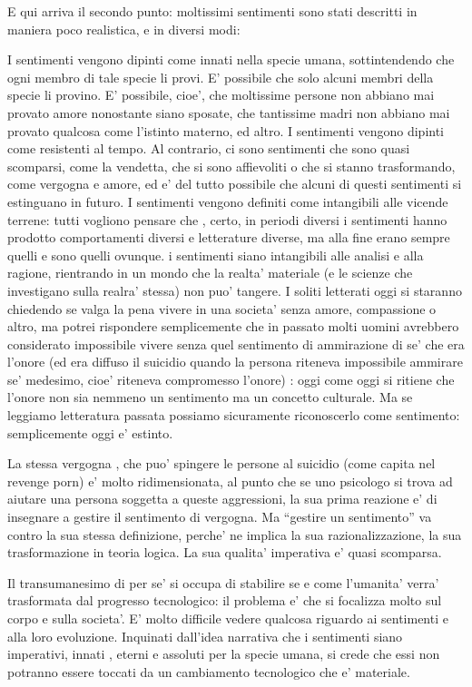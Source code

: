 \documentclass[dvipsnames]{amsart}
\begin{document}
  E qui arriva il secondo punto: moltissimi sentimenti sono stati descritti in maniera poco realistica, e in diversi modi:
  
  I sentimenti vengono dipinti come innati nella specie umana, sottintendendo che ogni membro di tale specie li provi. E’ possibile che solo alcuni membri della specie li provino. E’ possibile, cioe’, che moltissime persone non abbiano mai provato amore nonostante siano sposate, che tantissime madri non abbiano mai provato qualcosa come l’istinto materno, ed altro.
  I sentimenti vengono dipinti come resistenti al tempo. Al contrario, ci sono sentimenti che sono quasi scomparsi, come la vendetta, che si sono affievoliti o che si stanno trasformando, come vergogna e amore, ed e’ del tutto possibile che alcuni di questi sentimenti si estinguano in futuro.
  I sentimenti vengono definiti come intangibili alle vicende terrene: tutti vogliono pensare che , certo, in periodi diversi i sentimenti hanno prodotto comportamenti diversi e letterature diverse, ma alla fine erano sempre quelli e sono quelli ovunque.
  i sentimenti siano intangibili alle analisi e alla ragione, rientrando in un mondo che la realta’ materiale (e le scienze che investigano sulla realra’ stessa) non puo’ tangere.
  I soliti letterati oggi si staranno chiedendo se valga la pena vivere in una societa’ senza amore, compassione o altro, ma potrei rispondere semplicemente che in passato molti uomini avrebbero considerato impossibile vivere senza quel sentimento di ammirazione di se’ che era l’onore (ed era diffuso il suicidio quando la persona riteneva impossibile ammirare se’ medesimo, cioe’ riteneva compromesso l’onore) : oggi come oggi si ritiene che l’onore non sia nemmeno un sentimento ma un concetto culturale. Ma se leggiamo letteratura passata possiamo sicuramente riconoscerlo come sentimento: semplicemente oggi e’ estinto.
  
  La stessa vergogna , che puo’ spingere le persone al suicidio (come capita nel revenge porn) e’ molto ridimensionata, al punto che se uno psicologo si trova ad aiutare una persona soggetta a queste aggressioni, la sua prima reazione e’ di insegnare a gestire il sentimento di vergogna. Ma “gestire un sentimento” va contro la sua stessa definizione, perche’ ne implica la sua razionalizzazione, la sua trasformazione in teoria logica. La sua qualita’ imperativa e’ quasi scomparsa.
  
  Il transumanesimo di per se’ si occupa di stabilire se e come l’umanita’ verra’ trasformata dal progresso tecnologico: il problema e’ che si focalizza molto sul corpo e sulla societa’. E’ molto difficile vedere qualcosa riguardo ai sentimenti e alla loro evoluzione. Inquinati dall’idea narrativa che i sentimenti siano imperativi, innati , eterni e assoluti per la specie umana, si crede che essi non potranno essere toccati da un cambiamento tecnologico che e’ materiale.
  
\end{document}
